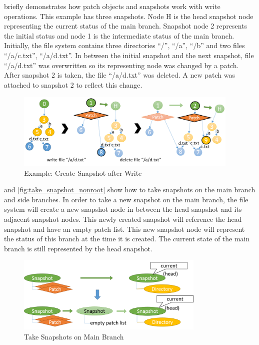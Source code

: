 	 briefly demonstrates how patch objects and snapshots work with write operations. This example has three snapshots. Node H is the head snapshot node representing the current status of the main branch. Snapshot node 2 represents the initial status and node 1 is the intermediate status of the main branch. Initially, the file system contains three directories ``/'', ``/a'', ``/b'' and two files ``/a/c.txt'', ``/a/d.txt''. In between the initial snapshot and the next snapshot, file ``/a/d.txt'' was overwritten so its representing node was changed by a patch. After snapshot 2 is taken, the file ``/a/d.txt'' was deleted. A new patch was attached to snapshot 2 to reflect this change.

\begin{figure}[t]
\centering
\includegraphics[width=0.95\textwidth]{Chapter-4/figs/fig26.png}
\caption{Example: Create Snapshot after Write}
\label{fig:create_snapshots}
\end{figure}

     and \ref{fig:take_snapshot_nonroot} show how to take snapshots on the main branch and side branches. In order to take a new snapshot on the main branch, the file system will create a new snapshot node in between the head snapshot and its adjacent snapshot nodes. This newly created snapshot will reference the head snapshot and have an empty patch list. This new snapshot node will represent the status of this branch at the time it is created. The current state of the main branch is still represented by the head snapshot.

\begin{figure}[t]
\centering
\includegraphics[width=0.8\textwidth]{Chapter-4/figs/fig20.png}
\caption{Take Snapshots on Main Branch}
\label{fig:take_snapshot_root}
\end{figure}
    

